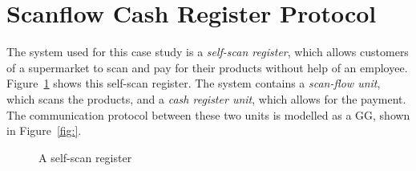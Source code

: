 \section{Scanflow Cash Register Protocol}

The system used for this case study is a \textit{self-scan register}, which allows customers of a supermarket to scan and pay for their products without help of an employee. Figure~\ref{fig:register} shows this self-scan register. The system contains a \textit{scan-flow unit}, which scans the products, and a \textit{cash register unit}, which allows for the payment. The communication protocol between these two units is modelled as a GG, shown in Figure~\ref{fig:}. 

\begin{figure}[ht]
  \begin{center}
  \end{center}
  \caption{A self-scan register}
  \label{fig:register}
\end{figure}
